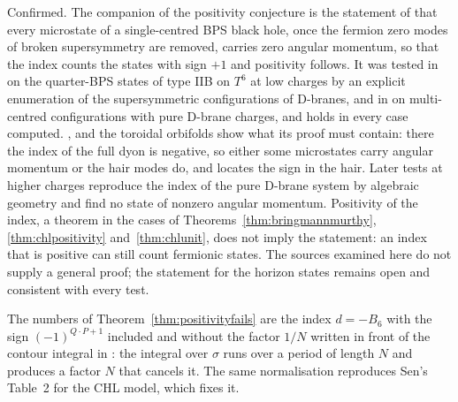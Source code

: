 \begin{verdict}[claim 36]
Confirmed. The companion of the positivity conjecture is the statement of \cite{CGMS16} that every microstate of a single-centred BPS black hole, once the fermion zero modes of broken supersymmetry are removed, carries zero angular momentum, so that the index counts the states with sign $+1$ and positivity follows. It was tested in \cite{CGMS16} on the quarter-BPS states of type IIB on $T^6$ at low charges by an explicit enumeration of the supersymmetric configurations of D-branes, and in \cite{HeidmannMondal19} on multi-centred configurations with pure D-brane charges, and holds in every case computed. , and the toroidal orbifolds show what its proof must contain: there the index of the full dyon is negative, so either some microstates carry angular momentum or the hair modes do, and \cite{CD21} locates the sign in the hair. Later tests at higher charges \cite{ChowdhuryMaji24,ChowdhuryMaji26} reproduce the index of the pure D-brane system by algebraic geometry and find no state of nonzero angular momentum. Positivity of the index, a theorem in the cases of Theorems~\ref{thm:bringmannmurthy}, \ref{thm:chlpositivity} and~\ref{thm:chlunit}, does not imply the statement: an index that is positive can still count fermionic states. The sources examined here do not supply a general proof; the statement for the horizon states remains open and consistent with every test.
\end{verdict}

\begin{remark}\label{rem:normalisation}
The numbers of Theorem~\ref{thm:positivityfails} are the index $d = -B_6$ with the sign $(-1)^{Q\cdot P+1}$ included and without the factor $1/N$ written in front of the contour integral in \cite{CD19}: the integral over $\sigma$ runs over a period of length $N$ and produces a factor $N$ that cancels it. The same normalisation reproduces Sen's Table~2 for the CHL model, which fixes it.
\end{remark}

